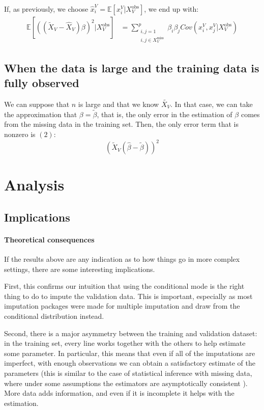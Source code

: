 \documentclass[12pt, a4paper]{memoir}
\begin{document}
 If, as previously, we choose $\hat{x}^V_i = \mathbb{E}[x^V_i \vert X_V^{\text{obs}}]$, we end up with:
 \begin{align*}
 \mathbb{E}[((\tilde{X}_V - \hat{X}_V)\beta)^2 \vert X_V^{\text{obs}}] &= 
 	\sum \limits_{\substack{i,j=1 \\i,j \in X_V^{\text{miss}}}}^{p} \beta_i \beta_j Cov(x^V_i, x^V_j \vert X_V^{\text{obs}})
 \end{align*}

		\subsection{When the data is large and the training data is fully observed}
We can suppose that $n$ is large and that we know $\tilde{X_V}$. In that case, we can take the approximation that $\beta = \tilde{\beta}$, that is, the only error in the estimation of $\beta$ comes from the missing data in the training set. Then, the only error term that is nonzero is $(2)$:
$$ (\tilde{X}_V (\hat{\beta} - \tilde{\beta}))^2$$
	\section{Analysis}
		\subsection{Implications}
\paragraph{Theoretical consequences}
If the results above are any indication as to how things go in more complex settings, there are some interesting implications. 

First, this confirms our intuition that using the conditional mode is the right thing to do to impute the validation data. This is important, especially as most imputation packages were made for multiple imputation and draw from the conditional distribution instead.

Second, there is a major asymmetry between the training and validation dataset: in the training set, every line works together with the others to help estimate some parameter. In particular, this means that even if all of the imputations are imperfect, with enough observations we can obtain a satisfactory estimate of the parameters (this is similar to the case of statistical inference with missing data, where under some assumptions the estimators are asymptotically consistent \cite{rubin_ignorability}). More data adds information, and even if it is incomplete it helps with the estimation.
\end{document}
